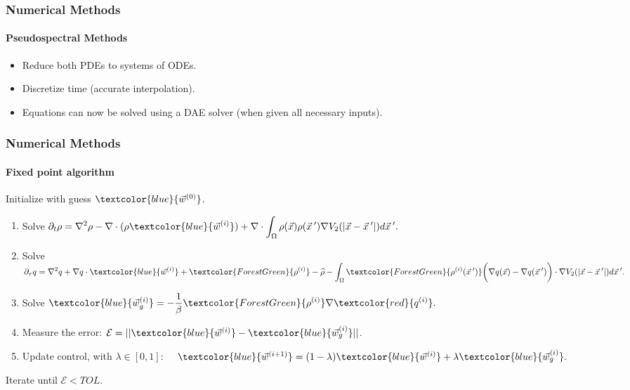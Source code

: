 \documentclass[aspectratio=169,xcolor=dvipsnames]{beamer}
\begin{document}
\begin{frame}
	\frametitle{Numerical Methods}
	\framesubtitle{Pseudospectral Methods}
	\vspace{0.3 cm}
    \begin{itemize}
    	\item Reduce both PDEs to systems of ODEs.
    	\item Discretize time (accurate interpolation).
    	\item Equations can now be solved using a DAE solver (when given all necessary inputs).
    \end{itemize}
	
\end{frame}


\begin{frame}
	\frametitle{Numerical Methods}
\framesubtitle{Fixed point algorithm}
\vspace{0.4 cm}
Initialize with guess $\textcolor{blue}{\vec{w}^{(0)}}$.
	\begin{enumerate}
     \item 
     Solve $\displaystyle \partial_t \rho  = \nabla^2 \rho  - \nabla \cdot (\rho \textcolor{blue}{\vec{w}^{(i)}} )
     + \nabla \cdot \int_\Omega \rho(\vec{x}) \rho(\vec{x}\hspace{0.2em}') \nabla V_2(|\vec{x}-\vec{x}\hspace{0.2em}'|)d\vec{x}\hspace{0.2em}'. 
     $
	 \item
     Solve $\displaystyle \partial_{{\tau}} q  = \nabla^2 q  + \nabla q  \cdot \textcolor{blue}{\vec{w}^{(i)}}  + \textcolor{ForestGreen}{\rho^{(i)}}  - \widehat \rho
     - \int_\Omega \textcolor{ForestGreen}{\rho^{(i)}(\vec{x}\hspace{0.2em}')} \bigg(\nabla q( \vec{x} ) - \nabla q( \vec{x}\hspace{0.2em}')\bigg) \cdot \nabla V_2(|\vec{x}-\vec{x}\hspace{0.2em}'|)d\vec{x}\hspace{0.2em}'. 
     $
     \item Solve $\displaystyle \textcolor{blue}{\vec{w}^{(i)}_g} = - \frac{1}{\beta}\textcolor{ForestGreen}{{\rho}^{(i)}} \nabla \textcolor{red}{{q}^{(i)}}.$
     \vspace{0.4 cm}
     \item Measure the error: $ \mathcal{E} = ||\textcolor{blue}{\vec{w}^{(i)}} - \textcolor{blue}{\vec{w}^{(i)}_g}||$.
     \vspace{0.2 cm}
	 \item Update control, with $\lambda \in [0,1]$:       $\quad \textcolor{blue}{\vec{w}^{(i+1)}} = (1-\lambda)\textcolor{blue}{\vec{w}^{(i)}} + \lambda \textcolor{blue}{\vec{w}^{(i)}_g}.$	 
	\end{enumerate}	
\vspace{0.2 cm}
Iterate until $\mathcal{E} <TOL$.
\end{frame}
\end{document}
